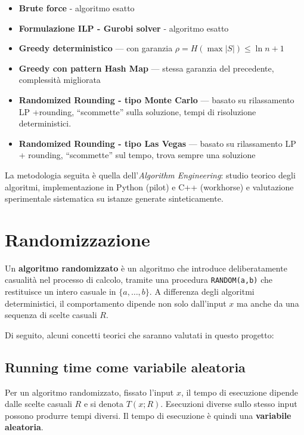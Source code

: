\documentclass[12pt, a4paper]{article}
\begin{document}
\begin{itemize}
    \item \textbf{Brute force} - algoritmo esatto
    \item \textbf{Formulazione ILP - Gurobi solver} - algoritmo esatto
    \item \textbf{Greedy deterministico} — con garanzia $\rho = H(\max|S|) \leq \ln n + 1$
    \item \textbf{Greedy con pattern Hash Map} — stessa garanzia del precedente, complessità migliorata
    \item \textbf{Randomized Rounding - tipo Monte Carlo} — basato su rilassamento LP +rounding, ``scommette'' sulla soluzione, tempi di risoluzione deterministici.
    \item \textbf{Randomized Rounding - tipo Las Vegas} — basato su rilassamento LP + rounding, ``scommette'' sul tempo, trova sempre una soluzione \end{itemize}

La metodologia seguita è quella dell'\textit{Algorithm Engineering}: studio teorico degli algoritmi, implementazione in Python (pilot)  e C++ (workhorse) e valutazione sperimentale sistematica su istanze 
generate sinteticamente.

\section{Randomizzazione}
\label{sec:randomizzazione}

Un \textbf{algoritmo randomizzato} è un algoritmo che introduce deliberatamente casualità nel processo di calcolo, tramite una procedura \texttt{RANDOM(a,b)} che restituisce un  
intero casuale in $\{a, \ldots, b\}$. A differenza degli algoritmi deterministici, il comportamento dipende non solo dall'input $x$ ma anche da una sequenza di scelte 
casuali $R$.

Di seguito, alcuni concetti teorici che saranno valutati in questo progetto:

\subsection*{Running time come variabile aleatoria}

Per un algoritmo randomizzato, fissato l'input $x$, il tempo di esecuzione dipende dalle scelte casuali $R$ e si denota $T(x; R)$. Esecuzioni diverse sullo stesso input 
possono produrre tempi diversi. Il tempo di esecuzione è quindi una \textbf{variabile aleatoria}.
\end{document}
